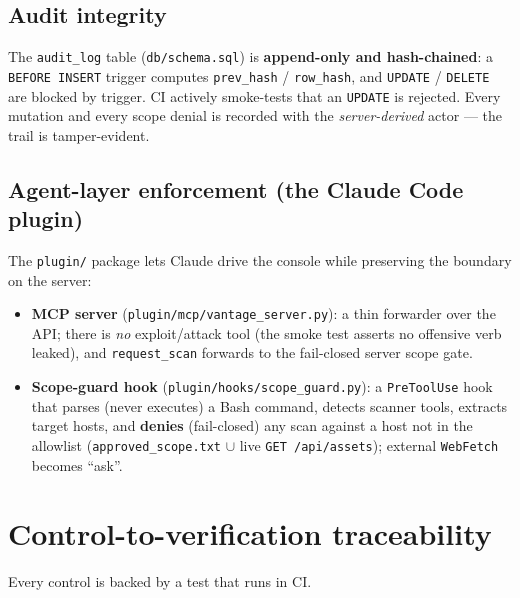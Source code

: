\documentclass[11pt,a4paper]{article}
\newcommand{\code}[1]{\texttt{#1}}
\begin{document}
\subsection{Audit integrity}
The \code{audit\_log} table (\code{db/schema.sql}) is \textbf{append-only and
hash-chained}: a \code{BEFORE INSERT} trigger computes \code{prev\_hash} /
\code{row\_hash}, and \code{UPDATE} / \code{DELETE} are blocked by trigger. CI
actively smoke-tests that an \code{UPDATE} is rejected. Every mutation and every
scope denial is recorded with the \emph{server-derived} actor --- the trail is
tamper-evident.

\subsection{Agent-layer enforcement (the Claude Code plugin)}
The \code{plugin/} package lets Claude drive the console while preserving the
boundary on the server:
\begin{itemize}
  \item \textbf{MCP server} (\code{plugin/mcp/vantage\_server.py}): a thin
        forwarder over the API; there is \emph{no} exploit/attack tool (the smoke
        test asserts no offensive verb leaked), and \code{request\_scan} forwards
        to the fail-closed server scope gate.
  \item \textbf{Scope-guard hook} (\code{plugin/hooks/scope\_guard.py}): a
        \code{PreToolUse} hook that parses (never executes) a Bash command,
        detects scanner tools, extracts target hosts, and \textbf{denies}
        (fail-closed) any scan against a host not in the allowlist
        (\code{approved\_scope.txt} $\cup$ live \code{GET /api/assets}); external
        \code{WebFetch} becomes ``ask''.
\end{itemize}

\section{Control-to-verification traceability}
Every control is backed by a test that runs in CI.
\end{document}
